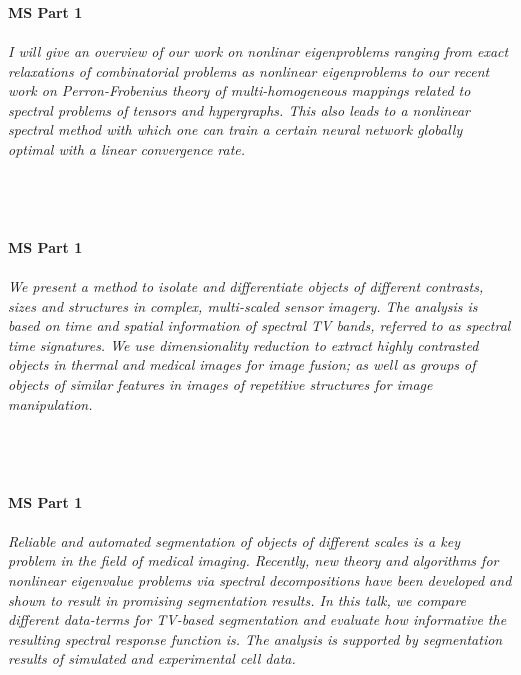 \begin{multicols}{2}
    \\
    \\\\
    \noindent\textbf{MS Part 1}\\
\\  
    \textit{I will give an overview of our work on nonlinar eigenproblems ranging from exact relaxations of combinatorial problems as nonlinear eigenproblems to our recent work on Perron-Frobenius theory of multi-homogeneous mappings related to spectral problems of tensors and hypergraphs. This also leads to a nonlinear spectral
method with which one can train a certain neural network globally optimal with a linear convergence rate.}\\
\\ 
    \\
    \\\\
    \noindent\textbf{MS Part 1}\\
\\  
    \textit{We present a method to isolate and differentiate objects of different contrasts, sizes and structures in complex, multi-scaled sensor imagery. The analysis is based on time and spatial information of spectral TV bands, referred to as spectral time signatures. We use dimensionality reduction to extract highly contrasted objects in thermal and medical images for image fusion; as well as groups of objects of similar features in images of repetitive structures for image manipulation.  }\\
\\ 
    \\
    \\\\
    \noindent\textbf{MS Part 1}\\
\\  
    \textit{Reliable and automated segmentation of objects of different scales is a key problem in the field of medical imaging. Recently, new theory and algorithms for nonlinear eigenvalue problems via spectral decompositions have been developed and shown to result in promising segmentation results. In this talk, we compare different data-terms for TV-based segmentation and evaluate how informative the resulting spectral response function is. The analysis is supported by segmentation results of simulated and experimental cell data.}\\

\end{multicols}
